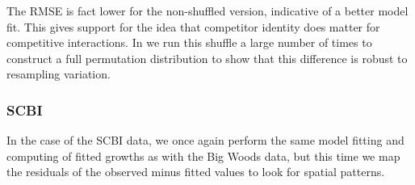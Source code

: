 \documentclass[12pt]{article}
\newenvironment{Shaded}{\begin{snugshade}}{\end{snugshade}}
\newcommand{\CommentTok}[1]{\textcolor[rgb]{0.56,0.35,0.01}{\textit{#1}}}
\newcommand{\DataTypeTok}[1]{\textcolor[rgb]{0.13,0.29,0.53}{#1}}
\newcommand{\KeywordTok}[1]{\textcolor[rgb]{0.13,0.29,0.53}{\textbf{#1}}}
\newcommand{\NormalTok}[1]{#1}
\newcommand{\OperatorTok}[1]{\textcolor[rgb]{0.81,0.36,0.00}{\textbf{#1}}}
\newcommand{\OtherTok}[1]{\textcolor[rgb]{0.56,0.35,0.01}{#1}}
\newcommand{\StringTok}[1]{\textcolor[rgb]{0.31,0.60,0.02}{#1}}
\begin{document}
\begin{Shaded}
\end{Shaded}

\begin{Shaded}
\end{Shaded}

\begin{Shaded}
\end{Shaded}

The RMSE is fact lower for the non-shuffled version, indicative of a
better model fit. This gives support for the idea that competitor
identity does matter for competitive interactions. In
\citet{allen_permutation_2020} we run this shuffle a large number of
times to construct a full permutation distribution to show that this
difference is robust to resampling variation.

\hypertarget{scbi-3}{%
\subsubsection{SCBI}\label{scbi-3}}

In the case of the SCBI data, we once again perform the same model
fitting and computing of fitted growths as with the Big Woods data, but
this time we map the residuals of the observed minus fitted values to
look for spatial patterns.
\end{document}
